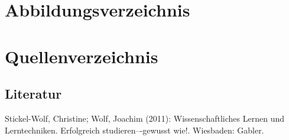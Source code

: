 \documentclass[a4paper,12pt,oneside]{article}
\begin{document}
  \newpage
  
  \tableofcontents
  
  \newpage
  \pagestyle{fancy} %
 
  \section*{Abbildungsverzeichnis}
  \renewcommand{\listfigurename}{} %
  \thispagestyle{empty}
  \listoffigures
  
  \newpage
  
  
  \newpage
    
    
    
    

    
   \newpage
    \thispagestyle{empty}
   \section{Quellenverzeichnis}
     \subsection{Literatur}
     \renewcommand{\refname}{} %
     \begin{thebibliography}{SW11} %
        Stickel-Wolf, Christine; Wolf, Joachim (2011): Wissenschaftliches Lernen und Lerntechniken. Erfolgreich studieren–-gewusst wie!. Wiesbaden: Gabler. 
     \end{thebibliography} 
          
\end{document}
